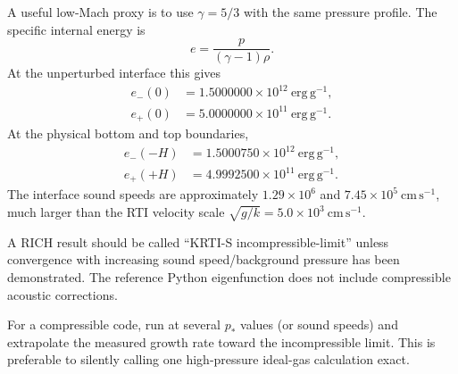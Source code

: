 \documentclass[11pt]{article}
\begin{document}
A useful low-Mach proxy is to use $\gamma=5/3$ with the same pressure profile. The specific internal energy is
\begin{equation}
e=\frac{p}{(\gamma-1)\rho}.
\end{equation}
At the unperturbed interface this gives
\begin{align}
e_-(0)&=1.5000000\times10^{12}\ \mathrm{erg\,g^{-1}},\\
e_+(0)&=5.0000000\times10^{11}\ \mathrm{erg\,g^{-1}}.
\end{align}
At the physical bottom and top boundaries,
\begin{align}
e_-(-H)&=1.5000750\times10^{12}\ \mathrm{erg\,g^{-1}},\\
e_+(+H)&=4.9992500\times10^{11}\ \mathrm{erg\,g^{-1}}.
\end{align}
The interface sound speeds are approximately $1.29\times10^6$ and $7.45\times10^5\ \mathrm{cm\,s^{-1}}$, much larger than the RTI velocity scale $\sqrt{g/k}=5.0\times10^3\ \mathrm{cm\,s^{-1}}$.

\begin{warningbox}
A RICH result should be called ``KRTI-S incompressible-limit'' unless convergence with increasing sound speed/background pressure has been demonstrated. The reference Python eigenfunction does not include compressible acoustic corrections.
\end{warningbox}

For a compressible code, run at several $p_*$ values (or sound speeds) and extrapolate the measured growth rate toward the incompressible limit. This is preferable to silently calling one high-pressure ideal-gas calculation exact.
\end{document}
